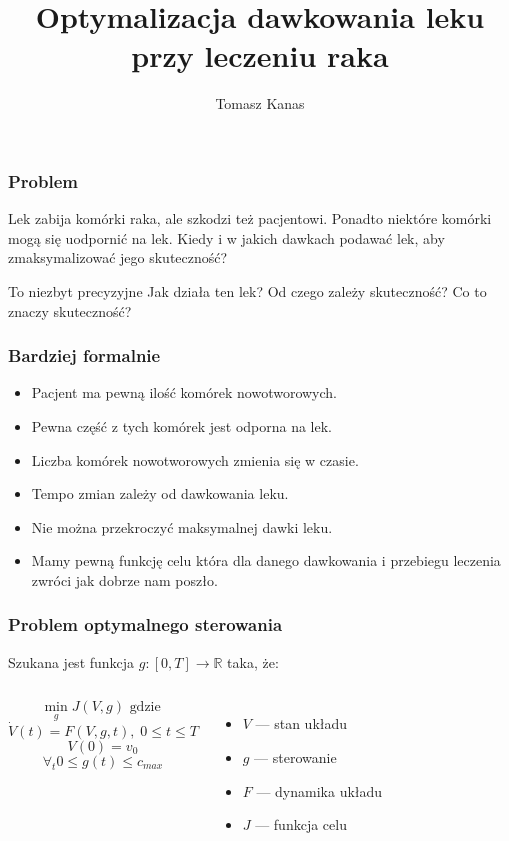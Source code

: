 \documentclass{beamer}
\title{Optymalizacja dawkowania leku przy leczeniu raka}
\author{Tomasz Kanas}
\def\R{\mathbb{R}}
\newcommand{\colw}[1]{\column{#1\textwidth}}
\begin{document}
\maketitle

\begin{frame}
  \frametitle{Problem}
  Lek zabija komórki raka, ale szkodzi też pacjentowi. Ponadto niektóre komórki mogą się uodpornić na lek. Kiedy i w jakich dawkach podawać lek, aby zmaksymalizować jego skuteczność?
  \begin{alertblock}{To niezbyt precyzyjne}
    Jak działa ten lek? Od czego zależy skuteczność? Co to znaczy skuteczność?
  \end{alertblock}
\end{frame}

\begin{frame}
  \frametitle{Bardziej formalnie}
  \begin{itemize}
  \item Pacjent ma pewną ilość komórek nowotworowych.
  \item Pewna część z tych komórek jest odporna na lek.
  \item Liczba komórek nowotworowych zmienia się w czasie.
  \item Tempo zmian zależy od dawkowania leku.
  \item Nie można przekroczyć maksymalnej dawki leku.
  \item Mamy pewną funkcję celu która dla danego dawkowania i przebiegu leczenia zwróci jak dobrze nam poszło.
  \end{itemize}
\end{frame}

\begin{frame}
  \frametitle{Problem optymalnego sterowania}
  \begin{center}Szukana jest funkcja $g : [0,T] \to \R$ taka, że: \end{center}
  \begin{columns}
    \colw{.5}
    \[\min_g J(V, g) \text{ gdzie }\]
    \[\dot{V}(t) = F(V, g, t),\; 0 \le t \le T\]
    \[V(0) = v_0\]
    \[\forall_t 0 \le g(t) \le c_{max}\]
    \colw{.5}
    \begin{itemize}
    \item $V$ --- stan układu
    \item $g$ --- sterowanie
    \item $F$ --- dynamika układu
    \item $J$ --- funkcja celu
    \end{itemize}
  \end{columns}
\end{frame}
\end{document}
